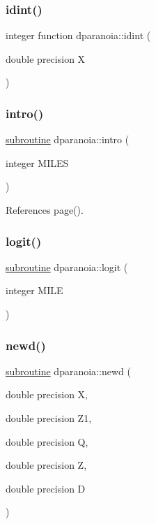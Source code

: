 \subsubsection{\texorpdfstring{idint()}{idint()}}
{\footnotesize\ttfamily integer function dparanoia\+::idint (\begin{DoxyParamCaption}\item[{double precision}]{X }\end{DoxyParamCaption})}

\mbox{\label{dparanoia_8f90_a9116036ac9f8a3d17b60a83da0f1657e}} 
\subsubsection{\texorpdfstring{intro()}{intro()}}
{\footnotesize\ttfamily \hyperlink{M__stopwatch_83_8txt_acfbcff50169d691ff02d4a123ed70482}{subroutine} dparanoia\+::intro (\begin{DoxyParamCaption}\item[{integer}]{M\+I\+L\+ES }\end{DoxyParamCaption})}



References page().

\mbox{\label{dparanoia_8f90_a6de1ce1dafc6660e6e63be69dfff7d05}} 
\subsubsection{\texorpdfstring{logit()}{logit()}}
{\footnotesize\ttfamily \hyperlink{M__stopwatch_83_8txt_acfbcff50169d691ff02d4a123ed70482}{subroutine} dparanoia\+::logit (\begin{DoxyParamCaption}\item[{integer}]{M\+I\+LE }\end{DoxyParamCaption})}

\mbox{\label{dparanoia_8f90_a5d9856a5c97c16ac70359378093a4b4b}} 
\subsubsection{\texorpdfstring{newd()}{newd()}}
{\footnotesize\ttfamily \hyperlink{M__stopwatch_83_8txt_acfbcff50169d691ff02d4a123ed70482}{subroutine} dparanoia\+::newd (\begin{DoxyParamCaption}\item[{double precision}]{X,  }\item[{double precision}]{Z1,  }\item[{double precision}]{Q,  }\item[{double precision}]{Z,  }\item[{double precision}]{D }\end{DoxyParamCaption})}

